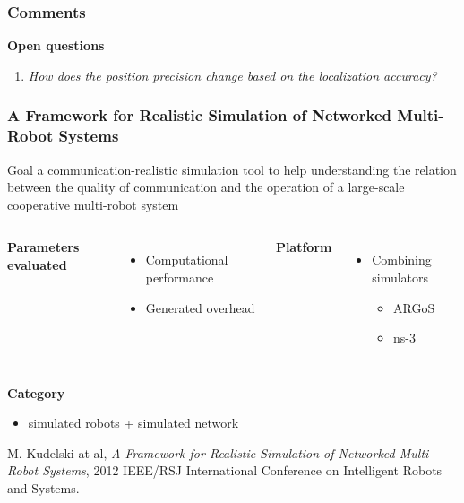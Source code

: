 \begin{frame}
	\frametitle{Comments}
	
	\textbf{Open questions}
	
	\begin{enumerate}
		\item \emph{How does the position precision change based on the localization accuracy?}
	\end{enumerate}
\end{frame}

\begin{frame}
	\frametitle{A Framework for Realistic Simulation of Networked Multi-Robot Systems}
	
	\normalsize
	
	\vspace{0.3cm}
	
	\begin{block}{Goal}
		a communication-realistic simulation tool to help understanding the relation between the quality of
		communication and the operation of a large-scale cooperative multi-robot system
	\end{block}
	
	\vspace{0.15cm}
	
	\begin{columns}[T]
		
		\textbf{Parameters evaluated}
		
		\begin{itemize}
			\item Computational performance
			
			\item Generated overhead
		\end{itemize}
		
		
		\textbf{Platform}
		
		\begin{itemize}
			\item Combining simulators
			
			\begin{itemize}
				\item ARGoS
				
				\item ns-3
			\end{itemize}
		\end{itemize}
	\end{columns}
	
	\textbf{Category}
	
	\begin{itemize}
		\item simulated robots + simulated network
	\end{itemize}
	
	\vspace{-0.12cm}
	
	\tiny
	M. Kudelski at al, \emph{A Framework for Realistic Simulation of Networked Multi-Robot Systems},
	\vspace{-0.35cm}
	2012 IEEE/RSJ International Conference on Intelligent Robots and Systems.
\end{frame}

